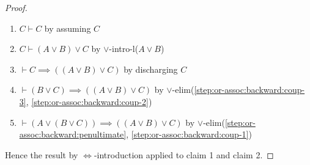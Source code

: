 \begin{proof}
\begin{enumerate}
\item $C\vdash C$ by assuming $C$
\item $C\vdash(A\lor B)\lor C$ by $\lor$-intro-l($A\lor B$)
\item\label{step:or-assoc:backward:coup-3} $\vdash C\implies((A\lor B)\lor C)$ by discharging $C$
\item\label{step:or-assoc:backward:penultimate} $\vdash(B\lor C)\implies((A\lor B)\lor C)$ by $\lor$-elim(\ref{step:or-assoc:backward:coup-3}, \ref{step:or-assoc:backward:coup-2})
\item $\vdash(A\lor(B\lor C))\implies((A\lor B)\lor C)$ by $\lor$-elim(\ref{step:or-assoc:backward:penultimate},
\ref{step:or-assoc:backward:coup-1})
\end{enumerate}
Hence the result by $\Leftrightarrow$-introduction applied to claim 1
and claim 2.
\end{proof}


